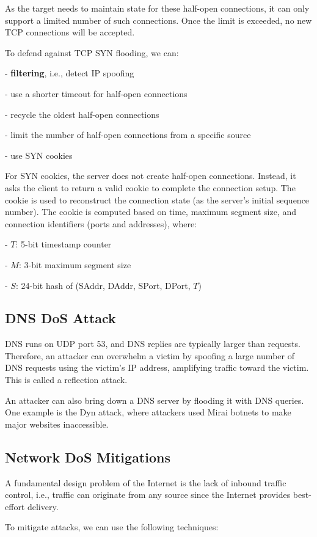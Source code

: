As the target needs to maintain state for these half-open connections, it can only support a limited number of such connections. Once the limit is exceeded, no new TCP connections will be accepted.  

To defend against TCP SYN flooding, we can:

- \textbf{filtering}, i.e., detect IP spoofing  

- use a shorter timeout for half-open connections  

- recycle the oldest half-open connections  

- limit the number of half-open connections from a specific source  

- use SYN cookies  

For SYN cookies, the server does not create half-open connections. Instead, it asks the client to return a valid cookie to complete the connection setup. The cookie is used to reconstruct the connection state (as the server's initial sequence number). The cookie is computed based on time, maximum segment size, and connection identifiers (ports and addresses), where:

- \(T\): 5-bit timestamp counter  

- \(M\): 3-bit maximum segment size  

- \(S\): 24-bit hash of (SAddr, DAddr, SPort, DPort, \(T\))  

\subsection{DNS DoS Attack}
DNS runs on UDP port 53, and DNS replies are typically larger than requests. Therefore, an attacker can overwhelm a victim by spoofing a large number of DNS requests using the victim's IP address, amplifying traffic toward the victim. This is called a reflection attack.  

An attacker can also bring down a DNS server by flooding it with DNS queries. One example is the Dyn attack, where attackers used Mirai botnets to make major websites inaccessible.  

\subsection{Network DoS Mitigations}
A fundamental design problem of the Internet is the lack of inbound traffic control, i.e., traffic can originate from any source since the Internet provides best-effort delivery.  

To mitigate attacks, we can use the following techniques:

